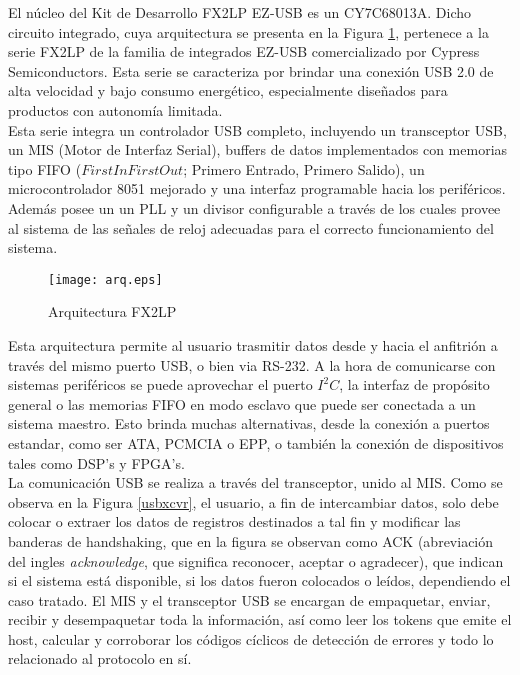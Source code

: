 	El núcleo del Kit de Desarrollo FX2LP EZ-USB es un CY7C68013A. Dicho circuito integrado, cuya arquitectura se presenta en la Figura \ref{arqEzUSB}, pertenece a la serie FX2LP de la familia de integrados EZ-USB comercializado por Cypress Semiconductors. Esta serie se caracteriza por brindar una conexión USB 2.0 de alta velocidad y bajo consumo energético, especialmente diseñados para productos con autonomía limitada.\\
	
	Esta serie integra un controlador USB completo, incluyendo un transceptor USB, un MIS (Motor de Interfaz Serial), buffers de datos implementados con memorias tipo FIFO (\(First In First Out\); Primero Entrado, Primero Salido), un microcontrolador 8051 mejorado y una interfaz programable hacia los periféricos. Además posee un un PLL y un divisor configurable a través de los cuales provee al sistema de las señales de reloj adecuadas para el correcto funcionamiento del sistema.\\
	
	\begin{figure}[h]
		\centering
		\texttt{[image: arq.eps]}
		\caption{Arquitectura FX2LP} 
		\label{arqEzUSB}
	\end{figure}

	Esta arquitectura permite al usuario trasmitir datos desde y hacia el anfitrión a través del  mismo puerto USB, o bien via RS-232. A la hora de comunicarse con sistemas periféricos se puede aprovechar el puerto $I^2C$, la interfaz de propósito general o las memorias FIFO en modo esclavo que puede ser conectada a un sistema maestro. Esto brinda muchas alternativas, desde la conexión a puertos estandar, como ser ATA, PCMCIA o EPP, o también la conexión de dispositivos tales como DSP's y FPGA's.\\
	
	La comunicación USB se realiza a través del transceptor, unido al MIS. Como se observa en la Figura \ref{usbxcvr}, el usuario, a fin de intercambiar datos, solo debe colocar o extraer los datos de registros destinados a tal fin y modificar las banderas de handshaking, que en la figura se observan como ACK (abreviación del ingles {\it acknowledge}, que significa reconocer, aceptar o agradecer), que indican si el sistema está disponible, si los datos fueron colocados o leídos, dependiendo el caso tratado. El MIS y el transceptor USB se encargan de empaquetar, enviar, recibir y desempaquetar toda la información, así como leer los tokens que emite el host, calcular y corroborar los códigos cíclicos de detección de errores y todo lo relacionado al protocolo en sí.\\
	

